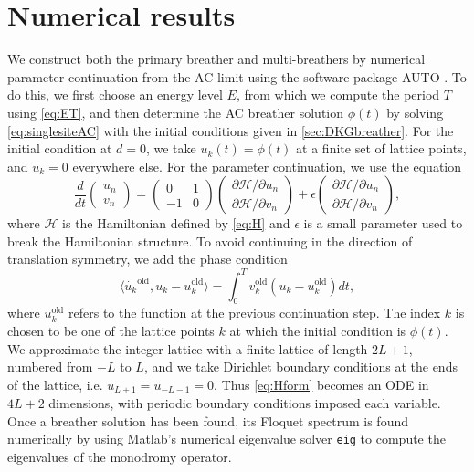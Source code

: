 \documentclass[12pt,reqno]{amsart}
\def\calH{\mathcal{H}}
\theoremstyle{definition}
\begin{document}
\section{Numerical results}\label{sec:numerics}

We construct both the primary breather and multi-breathers by numerical parameter continuation from the AC limit using the software package AUTO \cite{auto07p}. To do this, we first choose an energy level $E$, from which we compute the period $T$ using \cref{eq:ET}, and then determine the AC breather solution $\phi(t)$ by solving \cref{eq:singlesiteAC} with the initial conditions given in \cref{sec:DKGbreather}. For the initial condition at $d = 0$, we take $u_k(t) = \phi(t)$ at a finite set of lattice points, and $u_k = 0$ everywhere else. For the parameter continuation, we use the equation
\begin{equation}\label{eq:HformAUTO}
\frac{d}{dt}\begin{pmatrix} u_n \\ v_n \end{pmatrix} = 
\begin{pmatrix} 0 & 1 \\ -1 & 0 \end{pmatrix}\begin{pmatrix} \partial \calH / \partial u_n \\ \partial \calH / \partial v_n \end{pmatrix} + 
\epsilon \begin{pmatrix} \partial \calH / \partial u_n \\ \partial \calH / \partial v_n \end{pmatrix},
\end{equation}
where $\calH$ is the Hamiltonian defined by \cref{eq:H} and $\epsilon$ is a small parameter used to break the Hamiltonian structure. To avoid continuing in the direction of translation symmetry, we add the phase condition
\[
\langle \dot{u_k}^\text{old}, u_k - u_k^\text{old} \rangle =
\int_0^T v_k^\text{old}( u_k - u_k^\text{old}) dt,
\]
where $u_k^\text{old}$ refers to the function at the previous continuation step. The index $k$ is chosen to be one of the lattice points $k$ at which the initial condition is $\phi(t)$. We approximate the integer lattice with a finite lattice of length $2L+1$, numbered from $-L$ to $L$, and we take Dirichlet boundary conditions at the ends of the lattice, i.e. $u_{L+1} = u_{-L-1} = 0$. Thus \cref{eq:Hform} becomes an ODE in $4L+2$ dimensions, with periodic boundary conditions imposed each variable. Once a breather solution has been found, its Floquet spectrum is found numerically by using Matlab's numerical eigenvalue solver \texttt{eig} to compute the eigenvalues of the monodromy operator.
\end{document}
